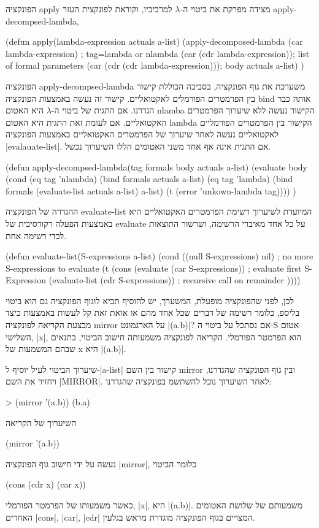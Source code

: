 \documentclass[a4paper,12pt,reqno]{article}
\begin{document}
הפונקציה apply מצידה מפרקת את ביטוי ה-$λ$ למרכיביו, וקוראת לפונקצית העזר
apply-decompsed-lambda,
\begin{LISP}
(defun apply(lambda-expression actuals a-list)
  (apply-decomposed-lambda
    (car lambda-expression) ; tag=lambda or nlambda
    (car (cdr lambda-expression)); list of formal parameters
    (car (cdr (cdr lambda-expression))); body
    actuals
    a-list)
)
\end{LISP}
הפונקציה apply-decompsed-lambda משערכת את גוף הפונקציה, בסביבה הכוללת קישור בין
הפרמטרים הפורמלים לאקטואליים. קישור זה נעשה באמצעות הפונקציה bind אותה כבר
הגדרנו.  אם התגית של ביטוי ה-$λ$ היא האטום nlamba הקישור נעשה ללא שיערוך
הפרמטרים האקטואליים. אם לעומת זאת התגית היא האטום lambda הקישור בין הפרמטרים
הפורמליים לאקטואליים נעשה לאחר שיערוך של הפרמטרים האקטואליים באמצעות הפונקציה
\E|evalauate-list|. אם התגית אינה אף אחד משני האטומים הללו השיערוך נכשל.
\begin{LISP}
(defun apply-decompsed-lambda(tag formals body actuals a-list)
  (evaluate body
    (cond
      (eq tag 'nlambda) (bind formals actuals a-list)
      (eq tag 'lambda) (bind formals (evaluate-list actuals a-list) a-list)
      (t (error 'unkown-lambda tag))))
)
\end{LISP}
ההגדרה של הפונקציה evaluate-list המיועדת לשיערוך רשימת הפרמטרים האקטואליים היא
באמצעות הפעלה רקורסיבית של evaluate על כל אחד מאיברי הרשימה, ושרשור התוצאות
לכדי רשימה אחת.
\begin{LISP}
(defun
  evaluate-list(S-expressions a-list)
    (cond
      ((null S-expressions) nil) ; no more S-expressions to evaluate
      (t
        (cons
          (evaluate (car S-expressions)) ; evaluate first S-Expression
          (evaluate-list (cdr S-expressions)) ; recursive call on remainder
))))
\end{LISP}

לכן, לפני שהפונקציה מופעלת, המשערך, יש להוסיף תביא לוגוף הפונקציה גם הוא ביטוי
בליספ, כלומר רשימה של דברים שכל אחד מהם או אואת זאת קל לעשות באמצעות
כיצד מבצעת הקריאה לפונקציה mirror על הארגמונט \E|(a.b)|? אם נסתכל על ביטוי ה-S
אטום השלישי, \E|x|, הוא הפרמטר הפורמלי.
הקריאה לפונקציה משמעותה חישוב הביטוי, בתנאים שבהם המשמעות של x היא
\E|(a.b)|.

שיערוך הביטוי לעיל יוסיף ל-\E|a-list| קישור בין השם mirror ובין גוף הפונקציה
שהגדרנו, ויחזיר את השם
\T|MIRROR|.
לאחר השיערוך נוכל להשתשמ בפונקציה שהגדרנו:
\begin{LISP}
> (mirror '(a.b))
(b.a)
\end{LISP}
השיערוך של הקריאה
\begin{LISP}
  (mirror '(a.b))
\end{LISP}
נעשה על ידי חישוב גוף הפונקציה \E|mirror|, כלומר הביטוי
\begin{LISP}
  (cons (cdr x) (car x))
\end{LISP}
כאשר משמעותו של הפרמטר הפורמלי, \E|x|, היא \E|(a.b)|.
משמעותם של שלושת האטומים האחרים \E|cons|, \E|car|, \E|cdr| המצויים בגוף
הפונקציה מוגדרת מראש בגלעין.
\end{document}
